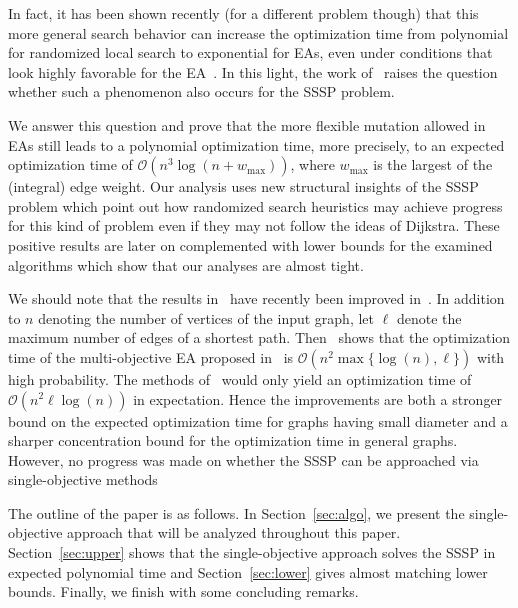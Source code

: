 \documentclass{sig-alternate}
\newcommand{\Oh}{\ensuremath{\mathcal{O}}}
\begin{document}
In fact, it has been shown recently (for a different problem though) that this 
more general search behavior can increase the optimization time from polynomial 
for randomized local search to exponential for EAs, even under conditions that 
look highly favorable for the EA~\cite{Doerr2:2008:gecco}. In this light, the 
work of~\cite{spea04} raises the question whether such a phenomenon also occurs 
for the SSSP problem. 

We answer this question and prove that the more flexible mutation 
allowed in EAs still leads to a polynomial optimization time, more precisely,
to an expected optimization time of $\Oh(n^3 \log(n + w_{\max}))$, where $w_{\max}$ is the largest of the (integral) edge weight. Our analysis uses 
new structural insights of the SSSP problem which point out how randomized 
search heuristics may achieve progress for this kind of problem even if they may 
not follow the ideas of Dijkstra. These positive results are later on 
complemented with lower bounds for the examined algorithms which show that our 
analyses are almost tight. 

We should note that the results in~\cite{spea04} have 
recently been improved in~\cite{ssspcec07}. In addition to $n$ denoting the number of vertices of the input graph, let $\ell$ denote the maximum number of edges of a shortest path. Then~\cite{ssspcec07} shows that the optimization time of the multi-objective EA proposed in~\cite{spea04} is $\Oh(n^2 \max\{\log(n), \ell\})$ with high probability. The methods of~\cite{spea04} would only yield an  optimization time of $\Oh(n^2 \ell \log(n))$ in expectation.
Hence the improvements are both a stronger bound on the expected optimization time
for graphs having small diameter and a sharper concentration bound for the optimization time in general graphs. However, no progress was made on whether the SSSP can 
be approached via single-objective methods

The outline of the paper is as follows. In Section~\ref{sec:algo}, we present 
the single-objective approach that will be analyzed throughout this paper. 
Section~\ref{sec:upper} shows that the single-objective approach solves the 
SSSP in expected polynomial time and Section~\ref{sec:lower} gives almost 
matching lower bounds. Finally, we finish with some concluding remarks.

 
\end{document}
